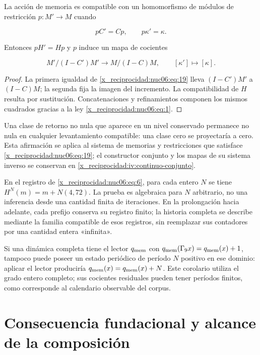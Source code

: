 La acción de memoria es compatible con un homomorfismo de módulos de restricción \(p:M'\to M\) cuando

\begin{equation}
pC'=Cp,\qquad p\kappa'=\kappa.
\label{x_reciprocidad:nuc06:eq:19}
\end{equation}

Entonces \(pH'=Hp\) y \(p\) induce un mapa de cocientes

\begin{equation}
M'/(I-C')M'\longrightarrow M/(I-C)M,
\qquad [\kappa']\longmapsto[\kappa].
\label{x_reciprocidad:nuc06:eq:20}
\end{equation}

\begin{proof}
La primera igualdad de \eqref{x_reciprocidad:nuc06:eq:19} lleva \((I-C')M'\) a \((I-C)M\); la segunda fija la imagen del incremento. La compatibilidad de \(H\) resulta por sustitución. Concatenaciones y refinamientos componen los mismos cuadrados gracias a la ley \eqref{x_reciprocidad:nuc06:eq:1}.
\end{proof}

Una clase de retorno no nula que aparece en un nivel conservado permanece no nula en cualquier levantamiento compatible: una clase cero se proyectaría a cero. Esta afirmación se aplica al sistema de memorias y restricciones que satisface \eqref{x_reciprocidad:nuc06:eq:19}; el constructor conjunto y los mapas de su sistema inverso se conservan en \cref{x_reciprocidad:iv:continuo-conjunto}.

En el registro de \eqref{x_reciprocidad:nuc06:eq:6}, para cada entero \(N\) se tiene \(H^N(m)=m+N(4,72)\). La prueba es algebraica para \(N\) arbitrario, no una inferencia desde una cantidad finita de iteraciones. En la prolongación hacia adelante, cada prefijo conserva su registro finito; la historia completa se describe mediante la familia compatible de esos registros, sin reemplazar sus contadores por una cantidad entera «infinita».

Si una dinámica completa tiene el lector \(q_{\rm mem}\) con \(q_{\rm mem}(\Gamma_9x)=q_{\rm mem}(x)+1\), tampoco puede poseer un estado periódico de período \(N\) positivo en ese dominio: aplicar el lector produciría \(q_{\rm mem}(x)=q_{\rm mem}(x)+N\). Este corolario utiliza el grado entero completo; sus cocientes residuales pueden tener períodos finitos, como corresponde al calendario observable del corpus.

\section{Consecuencia fundacional y alcance de la composición}


